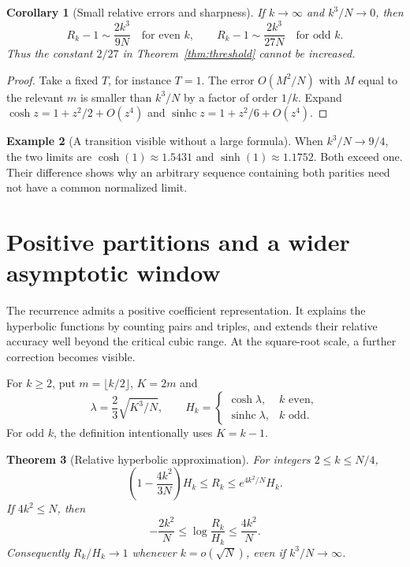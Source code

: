 \documentclass[11pt]{article}
\newtheorem{theorem}{Theorem}[section]
\newtheorem{corollary}[theorem]{Corollary}
\theoremstyle{definition}
\newtheorem{example}[theorem]{Example}
\theoremstyle{remark}
\newcommand{\1}{\mathbf 1}
\newcommand{\shc}{\operatorname{sinhc}}
\begin{document}
\begin{corollary}[Small relative errors and sharpness]\label{cor:small}
If $k\to\infty$ and $k^3/N\to0$, then
\[
R_k-1\sim\frac{2k^3}{9N}\quad\text{for even }k,
\qquad
R_k-1\sim\frac{2k^3}{27N}\quad\text{for odd }k.
\]
Thus the constant $2/27$ in Theorem~\ref{thm:threshold} cannot be increased.
\end{corollary}
\begin{proof}
Take a fixed $T$, for instance $T=1$. The error $O(M^2/N)$ with $M$ equal to the relevant $m$ is smaller than $k^3/N$ by a factor of order $1/k$. Expand $\cosh z=1+z^2/2+O(z^4)$ and $\shc z=1+z^2/6+O(z^4)$.
\end{proof}

\begin{example}[A transition visible without a large formula]
When $k^3/N\to9/4$, the two limits are $\cosh(1)\approx1.5431$ and $\sinh(1)\approx1.1752$. Both exceed one. Their difference shows why an arbitrary sequence containing both parities need not have a common normalized limit.
\end{example}


\clearpage
\section{Positive partitions and a wider asymptotic window}\label{sec:extension}

The recurrence admits a positive coefficient representation. It explains the hyperbolic functions by counting pairs and triples, and extends their relative accuracy well beyond the critical cubic range. At the square-root scale, a further correction becomes visible.

For $k\ge2$, put $m=\lfloor k/2\rfloor$, $K=2m$ and
\begin{equation}\label{eq:hyperdef}
\lambda=\frac23\sqrt{K^3/N},\qquad
H_k=\begin{cases}\cosh\lambda,&k\text{ even},\\
\shc\lambda,&k\text{ odd}.
\end{cases}
\end{equation}
For odd $k$, the definition intentionally uses $K=k-1$.



\begin{theorem}[Relative hyperbolic approximation]\label{thm:window}
For integers $2\le k\le N/4$,
\begin{equation}\label{eq:envelope}
\left(1-\frac{4k^2}{3N}\right)H_k
\le R_k\le e^{4k^2/N}H_k.
\end{equation}
If $4k^2\le N$, then
\begin{equation}\label{eq:logerror}
-\frac{2k^2}N\le\log\frac{R_k}{H_k}\le\frac{4k^2}N.
\end{equation}
Consequently $R_k/H_k\to1$ whenever $k=o(\sqrt N)$, even if $k^3/N\to\infty$.
\end{theorem}
\end{document}
